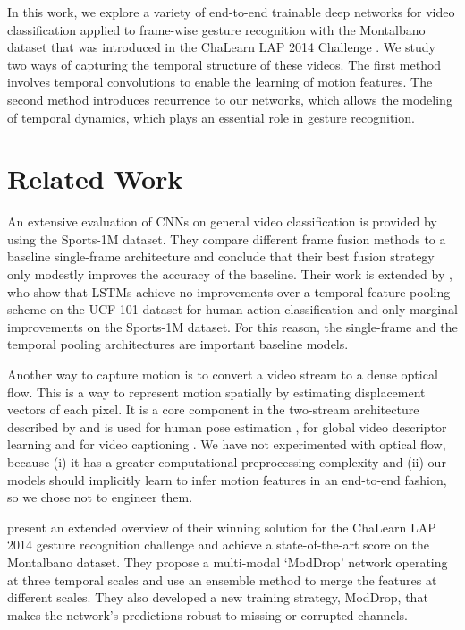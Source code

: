 \documentclass[11pt,a4paper]{article} \usepackage{a4wide}
\begin{document}
In this work, we explore a variety of end-to-end trainable deep networks for video classification applied to frame-wise gesture recognition with the Montalbano dataset that was introduced in the ChaLearn LAP 2014 Challenge \citep{chalearn14}. We study two ways of capturing the temporal structure of these videos. The first method involves temporal convolutions to enable the learning of motion features. The second method introduces recurrence to  our networks, which allows the modeling of temporal dynamics, which plays an essential role in gesture recognition. 









\section{Related Work} \label{sec:relwork}

An extensive evaluation of CNNs on general video classification is provided by \citet{karpathy2014large} using the Sports-1M dataset. They compare different frame fusion methods to a baseline single-frame architecture and conclude that their best fusion strategy only modestly improves the accuracy of the baseline.
Their work is extended by \citet{ng2015beyond}, who show that LSTMs achieve no improvements over a temporal feature pooling scheme on the UCF-101 dataset for human action classification and only marginal improvements on the Sports-1M dataset. For this reason, the single-frame and the temporal pooling architectures are important baseline models.

Another way to capture motion is to convert a video stream to a dense optical flow. This is a way to represent motion spatially by estimating displacement vectors of each pixel. It is a core component in the two-stream architecture described by \cite{simonyan2014two} and is used for human pose estimation \citep{jain2014modeep}, for global video descriptor learning \citep{ng2015beyond} and for video captioning \citep{venugopalan2015sequence}. We have not experimented with optical flow, because (i) it has a greater computational preprocessing complexity and (ii) our models should implicitly learn to infer motion features in an end-to-end fashion, so we chose not to engineer them.

\cite{neverova2014moddrop} present an extended overview of their winning solution for the ChaLearn LAP 2014 gesture recognition challenge and achieve a state-of-the-art score on the Montalbano dataset. They propose a multi-modal `ModDrop' network operating at three temporal scales and use an ensemble method to merge the features at different scales. They also developed a new training strategy, ModDrop, that makes the network's predictions robust to missing or corrupted channels.
\end{document}
